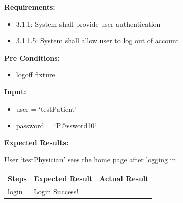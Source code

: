 \documentclass[letterpaper,10pt,english]{sphinxmanual}
\begin{document}
\begin{fulllineitems}
\label{STD/test_login:test_login.test_login_patient}
\textbf{Requirements:}
\begin{itemize}
\item {} 
3.1.1: System shall provide user authentication

\item {} 
3.1.1.5: System shall allow user to log out of account

\end{itemize}

\textbf{Pre Conditions:}
\begin{itemize}
\item {} 
logoff fixture

\end{itemize}

\textbf{Input:}
\begin{itemize}
\item {} 
user = `testPatient'

\item {} 
password = \href{mailto:'P@ssword10}{`P@ssword10}`

\end{itemize}

\textbf{Expected Results:}

User `testPhysician' sees the home page after logging in

\begin{tabulary}{\linewidth}{|L|L|L|}
\hline
\textsf{\relax 
Steps
} & \textsf{\relax 
Expected Result
} & \textsf{\relax 
Actual Result
}\\
\hline
login
 & 
Login Success!
 & \\
\hline\end{tabulary}


\end{fulllineitems}

\end{document}
